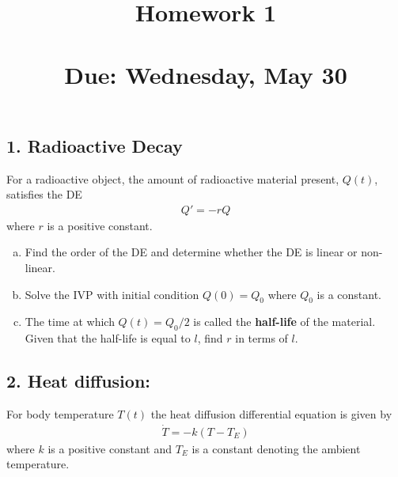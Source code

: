 

\renewcommand{\baselinestretch}{1}

\title{Homework 1 \\ \hfill \\ Due: Wednesday, May 30}


\maketitle

\thispagestyle{fancy}








\subsection*{1. Radioactive Decay}
For a radioactive object, the amount of radioactive material present, $ Q(t) $, satisfies the DE
	\begin{align*}
	Q '  = -r Q
	\end{align*}
where $ r $ is a positive constant.
        \begin{enumerate}[a)]
        \item Find the order of the DE and determine whether the DE is linear or non-linear.
        \item Solve the IVP with initial condition $ Q (0) = Q _ 0 $ where $ Q _ 0 $ is a constant.
        \item The time at which $ Q(t) = Q _ 0 / 2 $ is called the \textbf{half-life} of the material. Given that the half-life is equal to $ l $, find $ r $ in terms of $ l $.
        \end{enumerate}


\subsection*{2. Heat diffusion: }
For body temperature $ T(t) $ the heat diffusion differential equation is given by
	\begin{align*}
	\dot{T} = -k (T - T _ E)
	\end{align*}
where $ k $ is a positive constant and $ T _ E $ is a constant denoting the ambient temperature.

